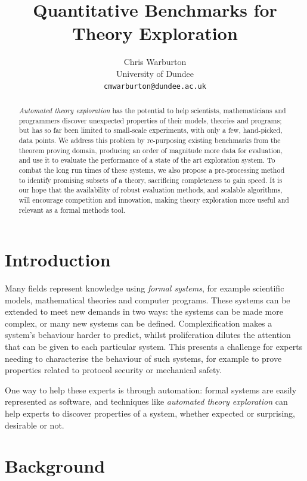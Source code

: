 \documentclass[]{default}
\title{Quantitative Benchmarks for Theory Exploration}
\author{Chris Warburton \\
          University of Dundee \\
          \texttt{cmwarburton@dundee.ac.uk}}
\date{}
\begin{document}
\maketitle
\begin{abstract}
  \emph{Automated theory exploration} has the potential to help scientists,
  mathematicians and programmers discover unexpected properties of their models,
  theories and programs; but has so far been limited to small-scale experiments,
  with only a few, hand-picked, data points. We address this problem by
  re-purposing existing benchmarks from the theorem proving domain, producing an
  order of magnitude more data for evaluation, and use it to evaluate the
  performance of a state of the art exploration system. To combat the long run
  times of these systems, we also propose a pre-processing method to identify
  promising subsets of a theory, sacrificing completeness to gain speed. It is
  our hope that the availability of robust evaluation methods, and scalable
  algorithms, will encourage competition and innovation, making theory
  exploration more useful and relevant as a formal methods tool.
\end{abstract}

\section{Introduction}\label{introduction}

Many fields represent knowledge using \emph{formal systems}, for example
scientific models, mathematical theories and computer programs. These systems
can be extended to meet new demands in two ways: the systems can be made more
complex, or many new systems can be defined. Complexification makes a system's
behaviour harder to predict, whilst proliferation dilutes the attention that can
be given to each particular system. This presents a challenge for experts
needing to characterise the behaviour of such systems, for example to prove
properties related to protocol security or mechanical safety.

One way to help these experts is through automation: formal systems are easily
represented as software, and techniques like \emph{automated theory exploration}
can help experts to discover properties of a system, whether expected or
surprising, desirable or not.

\section{Background}\label{background}
\end{document}
